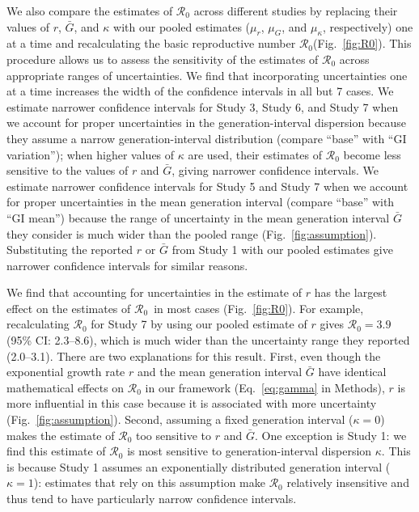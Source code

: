 \documentclass[12pt]{article}
\newcommand{\eref}[1]{Eq.~\ref{eq:#1}}
\newcommand{\fref}[1]{Fig.~\ref{fig:#1}}
\newcommand{\Ro}{\ensuremath{{\mathcal R}_{0}}\xspace}
\begin{document}
We also compare the estimates of \Ro across different studies by 
replacing their values of $r$, $\bar G$, and $\kappa$ with our pooled estimates ($\mu_r$, $\mu_G$, and $\mu_\kappa$, respectively) one at a time and recalculating the basic reproductive number \Ro (\fref{R0}).
This procedure allows us to assess the sensitivity of the estimates of \Ro across appropriate ranges of uncertainties.
We find that incorporating uncertainties one at a time increases the width of the confidence intervals in all but 7 cases.
We estimate narrower confidence intervals for Study 3, Study 6, and Study 7 when we account for proper uncertainties in the generation-interval dispersion because they assume a narrow generation-interval distribution (compare ``base'' with ``GI variation'');
when higher values of $\kappa$ are used, their estimates of \Ro become less sensitive to the values of $r$ and $\bar G$, giving narrower confidence intervals.
We estimate narrower confidence intervals for Study 5 and Study 7 when we account for proper uncertainties in the mean generation interval (compare ``base'' with ``GI mean'') because the range of uncertainty in the mean generation interval $\bar G$ they consider is much wider than the pooled range (\fref{assumption}).
Substituting the reported $r$ or $\bar G$ from Study 1 with our pooled estimates give narrower confidence intervals for similar reasons.

We find that accounting for uncertainties in the estimate of $r$ has the largest effect on the estimates of \Ro\ in most cases (\fref{R0}).
For example, recalculating \Ro for Study 7 by using our pooled estimate of $r$ gives $\Ro = 3.9$ (95\% CI: 2.3--8.6), which is much wider than the uncertainty range they reported (2.0--3.1).
There are two explanations for this result.
First, even though the exponential growth rate $r$ and the mean generation interval $\bar G$ have identical mathematical effects on \Ro in our framework (\eref{gamma} in Methods),
$r$ is more influential in this case because it is associated with more uncertainty (\fref{assumption}).
Second, assuming a fixed generation interval ($\kappa=0$) makes the estimate of \Ro too sensitive to $r$ and $\bar G$.
One exception is Study 1: we find this estimate of \Ro is most sensitive to generation-interval dispersion $\kappa$.
This is because Study 1 assumes an exponentially distributed generation interval ($\kappa=1$): estimates that rely on this assumption make \Ro relatively insensitive and thus tend to have particularly narrow confidence intervals.
\end{document}
